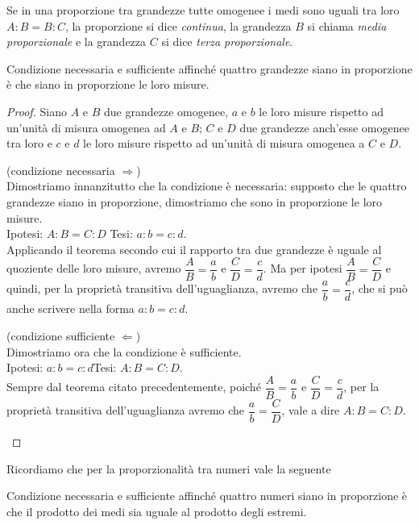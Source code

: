 \begin{definizione}
Se in una proporzione tra grandezze tutte omogenee i medi sono uguali tra loro $A : B = B : C$, la proporzione si dice \emph{continua}, la grandezza $B$ si chiama \emph{media proporzionale} e la grandezza $C$ si dice \emph{terza proporzionale}.
\end{definizione}

\begin{teorema}
Condizione necessaria e sufficiente affinché quattro grandezze siano in proporzione è che siano in proporzione le loro misure.
\end{teorema}

\begin{proof}
Siano $A$ e $B$ due grandezze omogenee, $a$ e $b$ le loro misure rispetto ad un'unità di misura omogenea ad $A$ e $B$; $C$ e $D$ due grandezze anch'esse omogenee tra loro e $c$ e $d$ le loro misure rispetto ad un'unità di misura omogenea a $C$ e $D$.
\begin{enumerate*}
\item (condizione necessaria $\Rightarrow$)\\
Dimostriamo innanzitutto che la condizione è necessaria: supposto che le quattro grandezze siano in proporzione, dimostriamo che sono in proporzione le loro misure.\\
Ipotesi: $A : B = C : D$ \tab Tesi: $a : b = c : d$.\\
Applicando il teorema secondo cui il rapporto tra due grandezze è uguale al quoziente delle loro misure, avremo $\dfrac{A}{B}=\dfrac{a}{b}$ e $\dfrac{C}{D}=\dfrac{c}{d}$. Ma per ipotesi $\dfrac{A}{B}=\dfrac{C}{D}$ e quindi, per la proprietà transitiva dell'uguaglianza, avremo che $\dfrac{a}{b}=\dfrac{c}{d}$, che si può anche scrivere nella forma $a : b = c : d$.

\item (condizione sufficiente $\Leftarrow$)\\
Dimostriamo ora che la condizione è sufficiente.\\
Ipotesi: $a : b = c : d$\tab Tesi: $A : B = C : D$.\\
Sempre dal teorema citato precedentemente, poiché $\dfrac{A}{B}=\dfrac{a}{b}$ e $\dfrac{C}{D}=\dfrac{c}{d}$, per la proprietà transitiva dell'uguaglianza avremo che $\dfrac{a}{b}=\dfrac{C}{D}$, vale a dire $A : B = C : D$.
\end{enumerate*}
\end{proof}

Ricordiamo che per la proporzionalità tra numeri vale la seguente
\begin{proprieta}
Condizione necessaria e sufficiente affinché quattro numeri siano in proporzione è che il prodotto dei medi sia uguale al prodotto degli estremi.
\end{proprieta}

